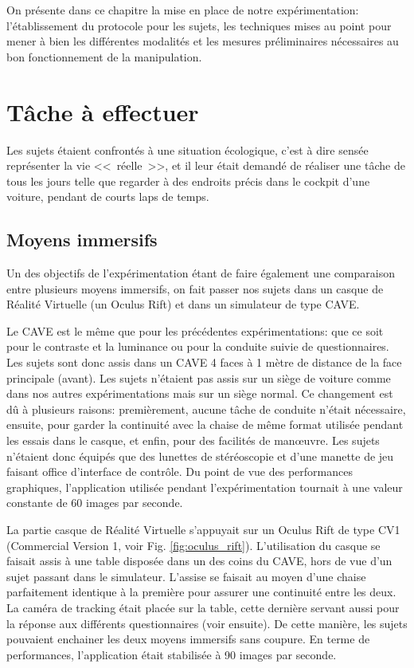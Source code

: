 	\par On présente dans ce chapitre la mise en place de notre expérimentation: l'établissement du protocole pour les sujets, les techniques mises au point pour mener à bien les différentes modalités et les mesures préliminaires nécessaires au bon fonctionnement de la manipulation.
	
	\section{Tâche à effectuer}
	\par Les sujets étaient confrontés à une situation écologique, c'est à dire sensée représenter la vie <<~réelle~>>, et il leur était demandé de réaliser une tâche de tous les jours telle que regarder à des endroits précis dans le cockpit d'une voiture, pendant de courts laps de temps.
	
	\subsection{Moyens immersifs}	
	\par Un des objectifs de l'expérimentation étant de faire également une comparaison entre plusieurs moyens immersifs, on fait passer nos sujets dans un casque de Réalité Virtuelle (un Oculus Rift) et dans un simulateur de type CAVE.
	
	\par Le CAVE est le même que pour les précédentes expérimentations: que ce soit pour le contraste et la luminance ou pour la conduite suivie de questionnaires. Les sujets sont donc assis dans un CAVE 4 faces à 1 mètre de distance de la face principale (avant). Les sujets n'étaient pas assis sur un siège de voiture comme dans nos autres expérimentations mais sur un siège normal. Ce changement est dû à plusieurs raisons: premièrement, aucune tâche de conduite n'était nécessaire, ensuite, pour garder la continuité avec la chaise de même format utilisée pendant les essais dans le casque, et enfin,  pour des facilités de manœuvre. Les sujets n'étaient donc équipés que des lunettes de stéréoscopie et d'une manette de jeu faisant office d'interface de contrôle. Du point de vue des performances graphiques, l'application utilisée pendant l'expérimentation tournait à une valeur constante de 60 images par seconde.
	
	\par La partie casque de Réalité Virtuelle s'appuyait sur un Oculus Rift de type CV1 (Commercial Version 1, voir Fig. \ref{fig:oculus_rift}). L'utilisation du casque se faisait assis à une table disposée dans un des coins du CAVE, hors de vue d'un sujet passant dans le simulateur. L'assise se faisait au moyen d'une chaise parfaitement identique à la première pour assurer une continuité entre les deux. La caméra de tracking était placée sur la table, cette dernière servant aussi pour la réponse aux différents questionnaires (voir ensuite). De cette manière, les sujets pouvaient enchainer les deux moyens immersifs sans coupure. En terme de performances, l'application était stabilisée à 90 images par seconde.
	
